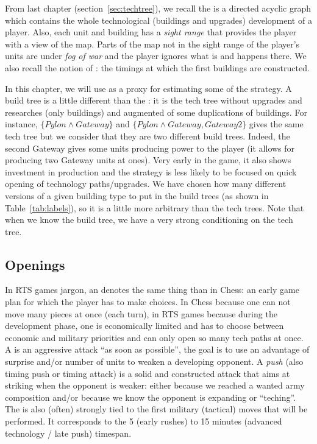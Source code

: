From last chapter (section~\ref{sec:techtree}), we recall the \textit{} is a directed acyclic graph which contains the whole technological (buildings and upgrades) development of a player. Also, each unit and building has a \textit{sight range} that provides the player with a view of the map. Parts of the map not in the sight range of the player's units are under \textit{fog of war} and the player ignores what is and happens there. We also recall the notion of : the timings at which the first buildings are constructed. 

In this chapter, we will use \textit{} as a proxy for estimating some of the strategy. A build tree is a little different than the : it is the tech tree without upgrades and researches (only buildings) and augmented of some duplications of buildings. For instance, $\{Pylon\wedge Gateway\}$ and $\{Pylon\wedge Gateway, Gateway2\}$ gives the same tech tree but we consider that they are two different build trees. Indeed, the second Gateway gives some units producing power to the player (it allows for producing two Gateway units at ones). Very early in the game, it also shows investment in production and the strategy is less likely to be focused on quick opening of technology paths/upgrades. 
We have chosen how many different versions of a given building type to put in the build trees (as shown in Table~\ref{tab:labels}), so it is a little more arbitrary than the tech trees. Note that when we know the build tree, we have a very strong conditioning on the tech tree.



\subsection{Openings}
\label{sec:openings}


In RTS games jargon, an \textit{} denotes the same thing than in Chess: an early game plan for which the player has to make choices. In Chess because one can not move many pieces at once (each turn), in RTS games because during the development phase, one is economically limited and has to choose between economic and military priorities and can only open so many tech paths at once. A \textit{} is an aggressive attack ``as soon as possible'', the goal is to use an advantage of surprise and/or number of units to weaken a developing opponent. A \textit{push} (also timing push or timing attack) is a solid and constructed attack that aims at striking when the opponent is weaker: either because we reached a wanted army composition and/or because we know the opponent is expanding or ``teching''. The  is also (often) strongly tied to the first military (tactical) moves that will be performed. It corresponds to the 5 (early rushes) to 15 minutes (advanced technology / late push) timespan. 

